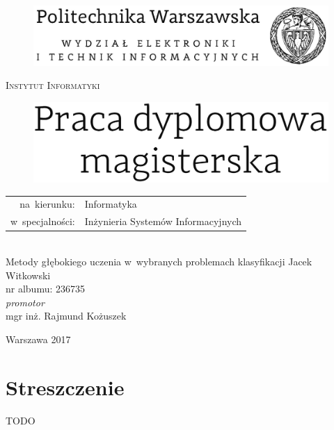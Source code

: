 \documentclass[12pt,a4paper,twoside]{report}
\begin{document}
\begin{titlepage}
  \begin{center}

    \begin{figure}[H]
	\centering
	\includegraphics[width=0.8\linewidth]{img/elka-logo.png}
    \end{figure}


    \textsc{\Large Instytut Informatyki}\\[4.0cm]

    \begin{figure}[H]
	\centering
	\includegraphics[width=0.8\linewidth]{img/pr-dyplomowa-text.png}
    \end{figure}
    \normalsize
    \begin{tabular}{rl}
      na~kierunku:& Informatyka \\
      w~specjalności:& Inżynieria Systemów Informacyjnych
     \end{tabular} \\[1.5cm]

    \Large Metody głębokiego uczenia w~wybranych problemach klasyfikacji
    \vfill
    \Huge Jacek Witkowski \\
    \normalsize nr albumu: 236735 \\[0.5cm]

    \normalsize \textit{promotor}\\
    mgr inż. Rajmund Kożuszek
    \vfill

    {\large Warszawa 2017}

  \end{center}
\end{titlepage}
\raggedbottom



\thispagestyle{empty} %
\section*{Streszczenie}
TODO
\end{document}
